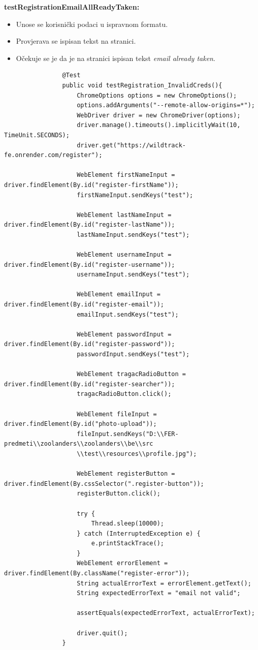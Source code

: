 			\textbf{testRegistrationEmailAllReadyTaken:}
			\begin{itemize}
				\item Unose se korisnički podaci u ispravnom formatu.
				\item Provjerava se ispisan tekst na stranici.
				\item Očekuje se je da je na stranici ispisan tekst \textit{email already taken}.
			\end{itemize}
			\begin{lstlisting}
				@Test
				public void testRegistration_InvalidCreds(){
					ChromeOptions options = new ChromeOptions();
					options.addArguments("--remote-allow-origins=*");
					WebDriver driver = new ChromeDriver(options);
					driver.manage().timeouts().implicitlyWait(10, TimeUnit.SECONDS);
					driver.get("https://wildtrack-fe.onrender.com/register");
					
					WebElement firstNameInput = driver.findElement(By.id("register-firstName"));
					firstNameInput.sendKeys("test");
					
					WebElement lastNameInput = driver.findElement(By.id("register-lastName"));
					lastNameInput.sendKeys("test");
					
					WebElement usernameInput = driver.findElement(By.id("register-username"));
					usernameInput.sendKeys("test");
					
					WebElement emailInput = driver.findElement(By.id("register-email"));
					emailInput.sendKeys("test");
					
					WebElement passwordInput = driver.findElement(By.id("register-password"));
					passwordInput.sendKeys("test");
					
					WebElement tragacRadioButton = driver.findElement(By.id("register-searcher"));
					tragacRadioButton.click();
					
					WebElement fileInput = driver.findElement(By.id("photo-upload"));
					fileInput.sendKeys("D:\\FER-predmeti\\zoolanders\\zoolanders\\be\\src
					\\test\\resources\\profile.jpg");
					
					WebElement registerButton = driver.findElement(By.cssSelector(".register-button"));
					registerButton.click();
					
					try {
						Thread.sleep(10000);
					} catch (InterruptedException e) {
						e.printStackTrace();
					}
					WebElement errorElement = driver.findElement(By.className("register-error"));
					String actualErrorText = errorElement.getText();
					String expectedErrorText = "email not valid";
					
					assertEquals(expectedErrorText, actualErrorText);
					
					driver.quit();
				}
			\end{lstlisting}
			
